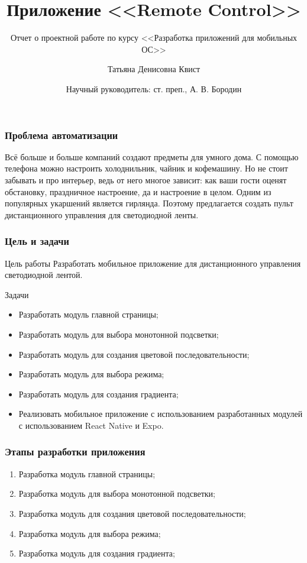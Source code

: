 \documentclass[hyperref={unicode}]{beamer}
\title[%
]{%
    Приложение <<Remote Control>>
}
\subtitle{Отчет о проектной работе по курсу <<Разработка приложений для мобильных ОС>>}
\author[%
    Татьяна Квист
]{%
    Татьяна Денисовна Квист
}
\date[%
    28.05.2021
]{%
    Научный руководитель: ст. преп., А. В. Бородин
}
\institute[%
    ПетрГУ
]{%
    Петрозаводский государственный университет\\
    Кафедра информатики и математического обеспечения
}
\begin{document}
\begin{frame}
\maketitle
\end{frame}

\begin{frame}
  \frametitle{Проблема автоматизации}
  Всё больше и больше компаний создают предметы для умного дома. С помощью телефона можно настроить холоднильник, чайник и кофемашину. Но не стоит забывать и про интерьер, ведь от него многое зависит: как ваши гости оценят обстановку, праздничное настроение, да и настроение в целом. Одним из популярных укаршений является гирлянда. Поэтому предлагается создать пульт дистанционного управления для светодиодной ленты. 
\end{frame}

\begin{frame}
  \frametitle{Цель и задачи}
  \begin{block}{Цель работы}
    Разработать мобильное приложение для дистанционного управления светодиодной лентой.
  \end{block}
  \begin{block}{Задачи}
  \begin{itemize}
    \item Разработать модуль главной страницы;
    \item Разработать модуль для выбора монотонной подсветки;
    \item Разработать модуль для создания цветовой последовательности;
    \item Разработать модуль для выбора режима;
    \item Разработать модуль для создания градиента;
    \item Реализовать мобильное приложение с использованием разработанных модулей с использованием React Native и Expo.
  \end{itemize}
  \end{block}
\end{frame}

\begin{frame}
    \frametitle{Этапы разработки приложения}
    \begin{enumerate}
        \item Разработка модуль главной страницы;
        \item Разработка модуль для выбора монотонной подсветки;
        \item Разработка модуль для создания цветовой последовательности;
        \item Разработка модуль для выбора режима;
        \item Разработка модуль для создания градиента;
    \end{enumerate}
\end{frame}
  
\end{document}
